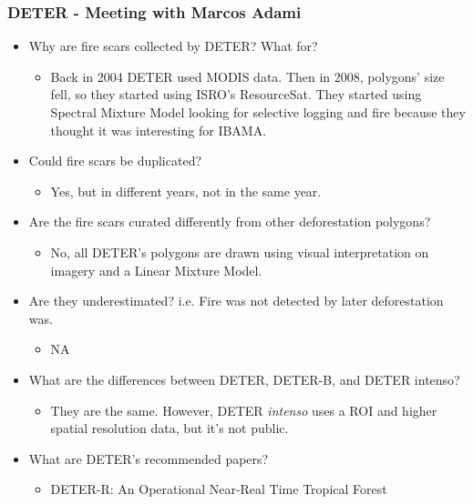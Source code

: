 \documentclass{beamer}
\begin{document}
\begin{frame}[t, allowframebreaks]
    \frametitle{DETER - Meeting with Marcos Adami}
    \begin{itemize}
        \item Why are fire scars collected by DETER? What for?
        \begin{itemize}
            \item Back in 2004 DETER used MODIS data. Then in 2008, polygons' 
                size fell, so they started using ISRO's ResourceSat. They 
                started using Spectral Mixture Model looking for selective 
                logging and fire because they thought it was interesting for
                IBAMA.
        \end{itemize}
        \item Could fire scars be duplicated? 
        \begin{itemize}
            \item Yes, but in different years, not in the same year.
        \end{itemize}
        \item Are the fire scars curated differently from other deforestation 
            polygons?
        \begin{itemize}
            \item No, all DETER's polygons are drawn using visual 
                interpretation on imagery and a Linear Mixture Model.
        \end{itemize}
        \item Are they underestimated? i.e. Fire was not detected by later 
            deforestation was.
        \begin{itemize}
            \item NA
        \end{itemize}
        \item What are the differences between DETER, DETER-B, and DETER 
            intenso?
        \begin{itemize}
            \item They are the same. However, DETER \textit{intenso} uses a ROI 
                and higher spatial resolution data, but it's not public.
        \end{itemize}
        \item What are DETER's recommended papers?
        \begin{itemize}
            \item DETER-R: An Operational Near-Real Time Tropical Forest 

\end{itemize}
\end{itemize}
\end{frame}
\end{document}
